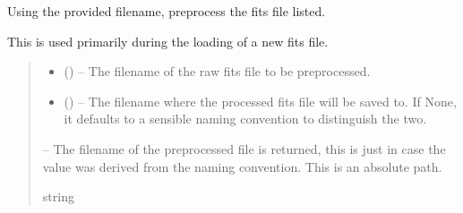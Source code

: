 \documentclass[letterpaper,11pt,english]{sphinxmanual}
\begin{document}
\begin{savenotes}
\begin{fulllineitems}
\begin{savenotes}\begin{fulllineitems}
\label{\detokenize{code/opihiexarata.gui.manual:opihiexarata.gui.manual.OpihiManualWindow._preprocess_fits_file}}
\pysigstartsignatures
{}
\pysigstopsignatures
\sphinxAtStartPar
Using the provided filename, preprocess the fits file listed.

\sphinxAtStartPar
This is used primarily during the loading of a new fits file.
\begin{quote}\begin{description}
\begin{itemize}
\item {} 
\sphinxAtStartPar
{} () – The filename of the raw fits file to be preprocessed.

\item {} 
\sphinxAtStartPar
{} (\sphinxstyleliteralemphasis{\sphinxupquote{, }}) – The filename where the processed fits file will be saved to. If
None, it defaults to a sensible naming convention to distinguish
the two.

\end{itemize}

\sphinxAtStartPar
{} – The filename of the preprocessed file is returned, this is just
in case the value was derived from the naming convention. This is
an absolute path.

\sphinxAtStartPar
string

\end{description}\end{quote}

\end{fulllineitems}\end{savenotes}



\end{fulllineitems}
\end{savenotes}
\end{document}
